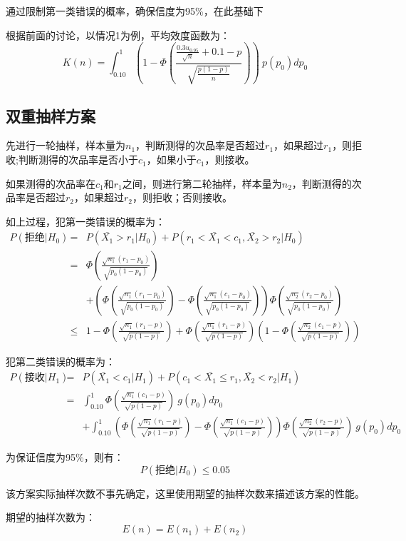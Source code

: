 \documentclass{article}
\begin{document}
	通过限制第一类错误的概率，确保信度为95\%，在此基础下
	
	根据前面的讨论，以情况1为例，平均效度函数为：
	\[
	K(n) = \int_{0.10}^{1} (1-\Phi(\frac{\frac{0.3 u_0.95}{\sqrt{n}}+0.1-p}{\sqrt{\frac{p(1-p)}{n}}}))\ p(p_0) dp_0
	\]
	
	\subsection*{双重抽样方案}
	先进行一轮抽样，样本量为$n_1$，判断测得的次品率是否超过$r_1$，如果超过$r_1$，则拒收;判断测得的次品率是否小于$c_1$，如果小于$c_1$，则接收。
	
	如果测得的次品率在$c_1$和$r_1$之间，则进行第二轮抽样，样本量为$n_2$，判断测得的次品率是否超过$r_2$，如果超过$r_2$，则拒收；否则接收。
	
	如上过程，犯第一类错误的概率为：
	\begin{eqnarray}
		\nonumber P(\text{拒绝} | H_0) &=& P(\bar{X_1} > r_1 | H_0) + P(r_1<\bar{X_1} < c_1 , \bar{X_2} > r_2 | H_0)\\
		\nonumber  &=& \Phi(\frac{\sqrt{n_1}(r_1-p_0)}{\sqrt{p_0(1-p_0)}}) \\
		\nonumber  &&+(\Phi(\frac{\sqrt{n_1}(r_1-p_0)}{\sqrt{p_0(1-p_0)}})-\Phi(\frac{\sqrt{n_1}(c_1-p_0)}{\sqrt{p_0(1-p_0)}}))\Phi(\frac{\sqrt{n_2}(r_2-p_0)}{\sqrt{p_0(1-p_0)}}) \\
		\nonumber  &\leq&1- \Phi(\frac{\sqrt{n_1}(r_1-p)}{\sqrt{p(1-p)}}) + \Phi(\frac{\sqrt{n_1}(r_1-p)}{\sqrt{p(1-p)}})(1-\Phi(\frac{\sqrt{n_2}(c_1-p)}{\sqrt{p(1-p)}}))
	\end{eqnarray}
	
	犯第二类错误的概率为：
	\begin{eqnarray}
		\nonumber P(\text{接收} | H_1) &=& P(\bar{X_1} < c_1 | H_1) + P(c_1 < \bar{X_1} \leq r_1 , \bar{X_2} < r_2 | H_1)\\
		\nonumber  &=& \int_{0.10}^{1} \Phi(\frac{\sqrt{n_1}(c_1-p)}{\sqrt{p(1-p)}})\ g(p_0) dp_0\\
		\nonumber  && + \int_{0.10}^{1} (\Phi(\frac{\sqrt{n_1}(r_1-p)}{\sqrt{p(1-p)}})-\Phi(\frac{\sqrt{n_1}(c_1-p)}{\sqrt{p(1-p)}}))\Phi(\frac{\sqrt{n_2}(r_2-p)}{\sqrt{p(1-p)}})\ g(p_0) dp_0
	\end{eqnarray}
	
	为保证信度为95\%，则有：
	\[
	P(\text{拒绝} | H_0) \leq 0.05
	\]
	
	该方案实际抽样次数不事先确定，这里使用期望的抽样次数来描述该方案的性能。
	
	期望的抽样次数为：
	\[
	E(n) = E(n_1) + E(n_2)
	\]
	
\end{document}
